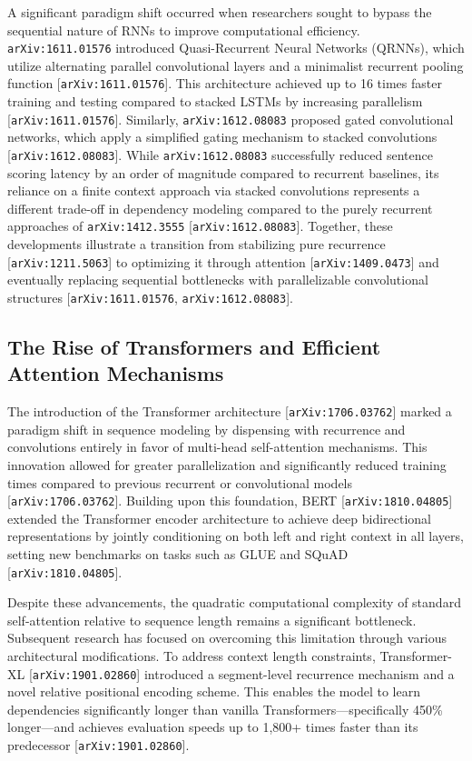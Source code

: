\documentclass[11pt]{article}
\begin{document}
A significant paradigm shift occurred when researchers sought to bypass the sequential nature of RNNs to improve computational efficiency. \texttt{arXiv:1611.01576} introduced Quasi-Recurrent Neural Networks (QRNNs), which utilize alternating parallel convolutional layers and a minimalist recurrent pooling function [\texttt{arXiv:1611.01576}]. This architecture achieved up to 16 times faster training and testing compared to stacked LSTMs by increasing parallelism [\texttt{arXiv:1611.01576}]. Similarly, \texttt{arXiv:1612.08083} proposed gated convolutional networks, which apply a simplified gating mechanism to stacked convolutions [\texttt{arXiv:1612.08083}]. While \texttt{arXiv:1612.08083} successfully reduced sentence scoring latency by an order of magnitude compared to recurrent baselines, its reliance on a finite context approach via stacked convolutions represents a different trade-off in dependency modeling compared to the purely recurrent approaches of \texttt{arXiv:1412.3555} [\texttt{arXiv:1612.08083}]. Together, these developments illustrate a transition from stabilizing pure recurrence [\texttt{arXiv:1211.5063}] to optimizing it through attention [\texttt{arXiv:1409.0473}] and eventually replacing sequential bottlenecks with parallelizable convolutional structures [\texttt{arXiv:1611.01576}, \texttt{arXiv:1612.08083}].

\subsection{The Rise of Transformers and Efficient Attention Mechanisms}

The introduction of the Transformer architecture [\texttt{arXiv:1706.03762}] marked a paradigm shift in sequence modeling by dispensing with recurrence and convolutions entirely in favor of multi-head self-attention mechanisms. This innovation allowed for greater parallelization and significantly reduced training times compared to previous recurrent or convolutional models [\texttt{arXiv:1706.03762}]. Building upon this foundation, BERT [\texttt{arXiv:1810.04805}] extended the Transformer encoder architecture to achieve deep bidirectional representations by jointly conditioning on both left and right context in all layers, setting new benchmarks on tasks such as GLUE and SQuAD [\texttt{arXiv:1810.04805}].

Despite these advancements, the quadratic computational complexity of standard self-attention relative to sequence length remains a significant bottleneck. Subsequent research has focused on overcoming this limitation through various architectural modifications. To address context length constraints, Transformer-XL [\texttt{arXiv:1901.02860}] introduced a segment-level recurrence mechanism and a novel relative positional encoding scheme. This enables the model to learn dependencies significantly longer than vanilla Transformers—specifically 450\% longer—and achieves evaluation speeds up to 1,800+ times faster than its predecessor [\texttt{arXiv:1901.02860}].
\end{document}
